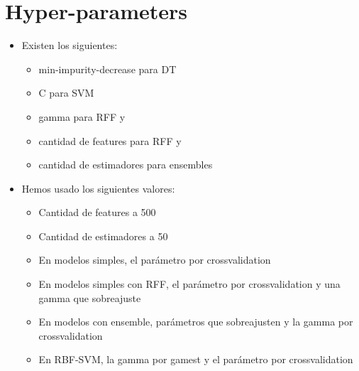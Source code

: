 \section{Hyper-parameters}
\begin{note}
  \begin{itemize}
    \item Existen los siguientes:
    \begin{itemize}
      \item min-impurity-decrease para DT
      \item C para SVM
      \item gamma para RFF y \Nys
      \item cantidad de features para RFF y \Nys
      \item cantidad de estimadores para ensembles
    \end{itemize}
    \item Hemos usado los siguientes valores:
    \begin{itemize}
      \item Cantidad de features a 500
      \item Cantidad de estimadores a 50
      \item En modelos simples, el parámetro por crossvalidation
      \item En modelos simples con RFF, el parámetro por crossvalidation
      y una gamma que sobreajuste
      \item En modelos con ensemble, parámetros que sobreajusten y la gamma
      por crossvalidation
      \item En RBF-SVM, la gamma por gamest y el parámetro por crossvalidation
    \end{itemize}
  \end{itemize}
\end{note}

